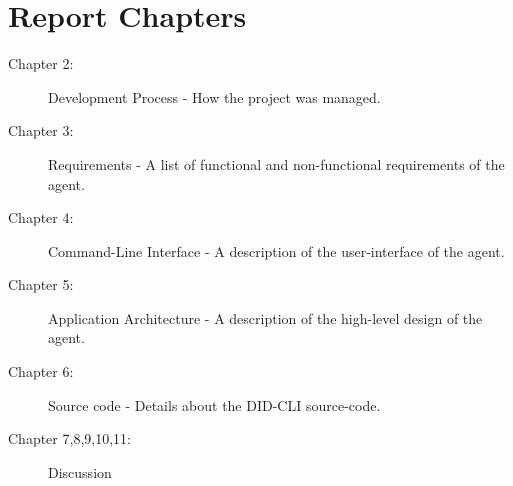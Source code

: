 \section{Report Chapters}

\begin{description}
    \item[Chapter 2:] Development Process - How the project was managed.
    \item[Chapter 3:] Requirements - A list of functional and non-functional requirements of the agent.
    \item[Chapter 4:] Command-Line Interface - A description of the user-interface of the agent.
    \item[Chapter 5:] Application Architecture - A description of the high-level design of the agent.
    \item[Chapter 6:] Source code - Details about the DID-CLI source-code.
    \item[Chapter 7,8,9,10,11:] Discussion

\end{description}






















